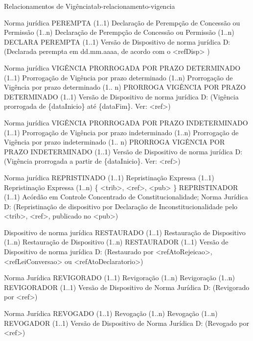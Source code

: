\begin{tabelarelacionamento}{Relacionamentos
de Vigência}{tab-relacionamento-vigencia}

  \relacionamento
  	{Norma jurídica}
 	{PEREMPTA (1..1)}
 	{Declaração de Perempção de Concessão ou Permissão}
 	{(1..n) Declaração de Perempção de Concessão ou Permissão (1..n)}
 	{DECLARA PEREMPTA (1..1)}
 	{Versão de Dispositivo de norma jurídica}
 	{D: (Declarada perempta em dd.mm.aaaa, de acordo com o <refDisp> )}

  \relacionamento
  	{Norma jurídica}
 	{VIGÊNCIA PRORROGADA POR PRAZO DETERMINADO (1..1)}
 	{Prorrogação de Vigência por prazo determinado}
 	{(1..n) Prorrogação de Vigência por prazo determinado (1.. n)
 	 }
 	{PRORROGA VIGÊNCIA POR PRAZO DETERMINADO  (1..1)}
 	{Versão de Dispositivo de norma jurídica}
 	{D: (Vigência prorrogada de \{dataInicio\} até \{dataFim\}. Ver: <ref>)}

  \relacionamento
  	{Norma jurídica}
 	{VIGÊNCIA PRORROGADA POR PRAZO INDETERMINADO (1..1)}
 	{Prorrogação de Vigência por prazo indeterminado}
 	{(1..n) Prorrogação de Vigência por prazo indeterminado (1.. n)
 	 \mypar
 	 [ DataInicio ]}
 	{PRORROGA VIGÊNCIA POR PRAZO INDETERMINADO (1..1)}
 	{Versão de Dispositivo de norma jurídica}
 	{D: (Vigência prorrogada a partir de \{dataInicio\}. Ver: <ref>)}

  \relacionamento
  	{Norma jurídica}
 	{REPRISTINADO (1..1)}
 	{Repristinação Expressa}
 	{(1..1) Repristinação Expressa (1..n)
 	 \mypar
 	 \{ <trib>, <ref>, <pub> \}}
 	{REPRISTINADOR (1..1)}
 	{Acórdão em Controle Concentrado de Constitucionalidade; Norma Jurídica}
 	{D: (Repristinação de dispositivo por Declaração de Inconstitucionalidade pelo <trib>, <ref>,  publicado no <pub>)}

  \relacionamento
  	{Dispositivo de norma jurídica}
 	{RESTAURADO (1..1)}
 	{Restauração de Dispositivo}
 	{(1..n) Restauração de Dispositivo (1..n)}
 	{RESTAURADOR (1..1)}
 	{Versão de Dispositivo de norma jurídica }
 	{D: (Restaurado por <refAtoRejeicao>, <refLeiConversao> ou <refAtoDeclaratorio>)}

  \relacionamento
  	{Norma Jurídica}
 	{REVIGORADO (1..1)}
 	{Revigoração}
 	{(1..n) Revigoração (1..n)}
 	{REVIGORADOR (1..1)}
 	{Versão de Dispositivo de Norma Jurídica}
 	{D: (Revigorado por <ref>)}

  \relacionamento
  	{Norma Jurídica}
 	{REVOGADO (1..1)}
 	{Revogação}
 	{(1..n) Revogação (1..n)}
 	{REVOGADOR (1..1)}
 	{Versão de Dispositivo de Norma Jurídica}
 	{D: (Revogado por <ref>)}


\end{tabelarelacionamento}

